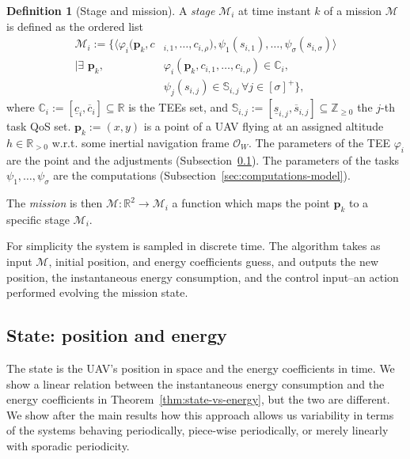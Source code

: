 \documentclass[letterpaper,10pt,conference]{ieeeconf}
\theoremstyle{definition}
\newtheorem{defn}{Definition}[section]
\begin{document}
\begin{defn}[Stage and mission]\label{def:mission}
  A \emph{stage} $\mathcal{M}_i$ at time instant $k$ of a mission $\mathcal{M}$ is defined as the ordered list
  \begin{equation}\label{eq:mission}\begin{split}
    \mathcal{M}_i:=\{\langle\varphi_i(\mathbf{p}_k,c&_{i,1},\dots,c_{i,\rho}),\psi_1(s_{i,1}),\dots,\psi_\sigma(s_{i,\sigma})\rangle\\\mid
      \exists\,\,\mathbf{p}_k,\,&\varphi_i(\mathbf{p}_k,c_{i,1},\dots,c_{i,\rho})\in\mathbb{C}_i,\,\\
      &\psi_j(s_{i,j})\in\mathbb{S}_{i,j}\,\forall j\in[\sigma]^+\},
  \end{split}\end{equation}
  where $\mathbb{C}_i:=[\underline{c}_i,\overline{c}_i]\subseteq\mathbb{R}$ is the TEEs set, and $\mathbb{S}_{i,j}:=[\underline{s}_{i,j},\overline{s}_{i,j}]\subseteq\mathbb{Z}_{\geq 0}$ the $j$-th task QoS set. $\mathbf{p}_k:=(x,y)$ is a point of a UAV flying at an assigned altitude $h\in\mathbb{R}_{>0}$ w.r.t. some inertial navigation frame $\mathcal{O}_W$. The parameters of the TEE $\varphi_i$ are the point and the adjustments (Subsection~\ref{sec:model}). The parameters of the tasks $\psi_1,\dots,\psi_\sigma$ are the computations (Subsection~\ref{sec:computations-model}).

  The \emph{mission} is then $\mathcal{M}:\mathbb{R}^2\rightarrow\mathcal{M}_i$ a function which maps the point $\mathbf{p}_k$ to a specific stage $\mathcal{M}_i$.
  
  For simplicity the system is sampled in discrete time. The algorithm takes as input $\mathcal{M}$, initial position, and energy coefficients guess, and outputs the new position, the instantaneous energy consumption, and the control input--an action performed evolving the mission state.
\end{defn}

\subsection{State: position and energy}
\label{sec:model}

The state is the UAV's position in space and the energy coefficients in time. We show a linear relation between the instantaneous energy consumption and the energy coefficients in Theorem~\ref{thm:state-vs-energy}, but the two are different. We show after the main results how this approach allows us variability in terms of the systems behaving periodically, piece-wise periodically, or merely linearly with sporadic periodicity.
\end{document}
